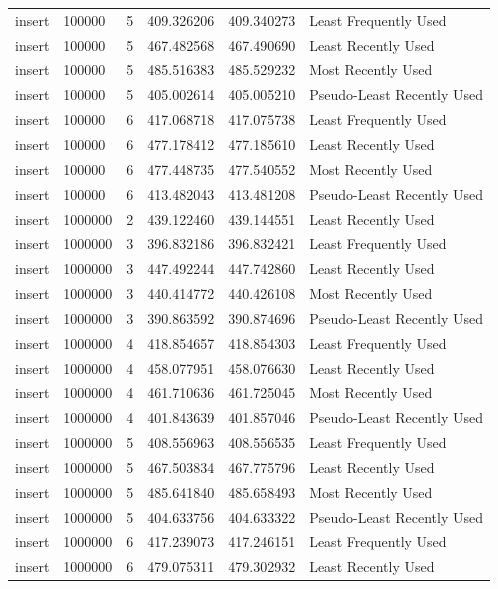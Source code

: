 \begin{tabular}{llrrrl}
insert & 100000 & 5 & 409.326206 & 409.340273 & Least Frequently Used \\
insert & 100000 & 5 & 467.482568 & 467.490690 & Least Recently Used \\
insert & 100000 & 5 & 485.516383 & 485.529232 & Most Recently Used \\
insert & 100000 & 5 & 405.002614 & 405.005210 & Pseudo-Least Recently Used \\
insert & 100000 & 6 & 417.068718 & 417.075738 & Least Frequently Used \\
insert & 100000 & 6 & 477.178412 & 477.185610 & Least Recently Used \\
insert & 100000 & 6 & 477.448735 & 477.540552 & Most Recently Used \\
insert & 100000 & 6 & 413.482043 & 413.481208 & Pseudo-Least Recently Used \\
insert & 1000000 & 2 & 439.122460 & 439.144551 & Least Recently Used \\
insert & 1000000 & 3 & 396.832186 & 396.832421 & Least Frequently Used \\
insert & 1000000 & 3 & 447.492244 & 447.742860 & Least Recently Used \\
insert & 1000000 & 3 & 440.414772 & 440.426108 & Most Recently Used \\
insert & 1000000 & 3 & 390.863592 & 390.874696 & Pseudo-Least Recently Used \\
insert & 1000000 & 4 & 418.854657 & 418.854303 & Least Frequently Used \\
insert & 1000000 & 4 & 458.077951 & 458.076630 & Least Recently Used \\
insert & 1000000 & 4 & 461.710636 & 461.725045 & Most Recently Used \\
insert & 1000000 & 4 & 401.843639 & 401.857046 & Pseudo-Least Recently Used \\
insert & 1000000 & 5 & 408.556963 & 408.556535 & Least Frequently Used \\
insert & 1000000 & 5 & 467.503834 & 467.775796 & Least Recently Used \\
insert & 1000000 & 5 & 485.641840 & 485.658493 & Most Recently Used \\
insert & 1000000 & 5 & 404.633756 & 404.633322 & Pseudo-Least Recently Used \\
insert & 1000000 & 6 & 417.239073 & 417.246151 & Least Frequently Used \\
insert & 1000000 & 6 & 479.075311 & 479.302932 & Least Recently Used \\

\end{tabular}
